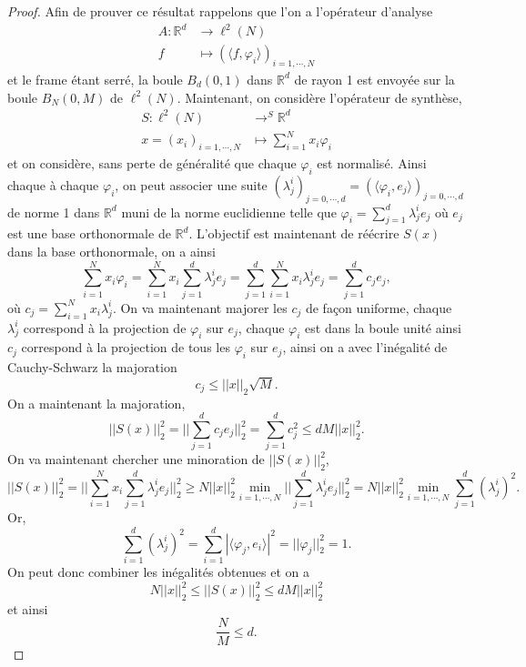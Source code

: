 \begin{proof}
	Afin de prouver ce résultat rappelons que l'on a l'opérateur d'analyse
	\begin{align}
		A :	\mathbb{R}^d &\longrightarrow \ell^2(N)\\
			f &\longmapsto (\langle f, \varphi_i \rangle)_{i=1,\cdots, N}
	\end{align}
	et le frame étant serré, la boule $B_d(0,1)$ dans $\mathbb{R}^d$ de rayon 1 est envoyée sur la boule $B_N(0,M)$ de $\ell^2(N)$.
	Maintenant, on considère l'opérateur de synthèse,
	\begin{align}
		S :	\ell^2(N) &\longrightarrow^S \mathbb{R}^d\\
			x=(x_i)_{i=1, \cdots, N} &\longmapsto \sum_{i=1}^N x_i \varphi_i
	\end{align}
	et on considère, sans perte de généralité que chaque $\varphi_i$ est normalisé. Ainsi chaque à chaque $\varphi_i$, on peut associer une suite $(\lambda_j^i)_{j=0, \cdots, d}=(\langle \varphi_i, e_j\rangle)_{j=0,\cdots, d}$ de norme 1 dans $\mathbb{R}^d$ muni de la norme euclidienne telle que $\varphi_i = \sum_{j=1}^d \lambda_j^i e_j$ où $e_j$ est une base orthonormale de $\mathbb{R}^d$. 
	L'objectif est maintenant de réécrire $S(x)$ dans la base orthonormale, on a ainsi
	\begin{equation}
		\sum_{i=1}^N x_i \varphi_i = \sum_{i=1}^N x_i \sum_{j=1}^d \lambda_j^i e_j = \sum_{j=1}^d \sum_{i=1}^N x_i \lambda_j^ie_j =\sum_{j=1}^d c_j e_j,
	\end{equation}
	où $c_j = \sum_{i=1}^Nx_i\lambda_j^i$. On va maintenant majorer les $c_j$ de façon uniforme, chaque $\lambda_j^i$ correspond à la projection de $\varphi_i$ sur $e_j$, chaque $\varphi_i$ est dans la boule unité ainsi $c_j$ correspond à la projection de tous les $\varphi_i$ sur $e_j$, ainsi on a avec l'inégalité de Cauchy-Schwarz la majoration
	\begin{equation}
		c_j \leq ||x||_2 \sqrt{M}.
	\end{equation}
	On a maintenant la majoration,
	\begin{equation}
		||S (x)||^2_2 = ||\sum_{j=1}^d c_j e_j||_2^2= \sum_{j=1}^d c_j^2 \leq d M||x||_2^2. 
	\end{equation}
	On va maintenant chercher une minoration de $||S(x)||_2^2$,
	\begin{equation}
		||S(x)||_2^2 = ||\sum_{i=1}^N x_i \sum_{j=1}^d \lambda_j^i e_j||_2^2 \geq N||x||_2^2 \min_{i=1, \cdots, N} ||\sum_{j=1}^d \lambda_j^i e_j||_2^2 = N||x||_2^2 \min_{i=1, \cdots, N}\sum_{j=1}^d (\lambda_j^i)^2.
	\end{equation}
	Or,
	\begin{equation}
		\sum_{i=1}^d (\lambda_j^i)^2 = \sum_{i=1}^d |\langle \varphi_j, e_i \rangle|^2 =||\varphi_j||_2^2=1.  
	\end{equation}
	On peut donc combiner les inégalités obtenues et on a
	\begin{equation}
		N ||x||_2^2 \leq ||S(x)||_2^2 \leq d M||x||_2^2
	\end{equation}
	et ainsi
	\begin{equation}
		\frac{N}{M} \leq d.
	\end{equation}
\end{proof}
